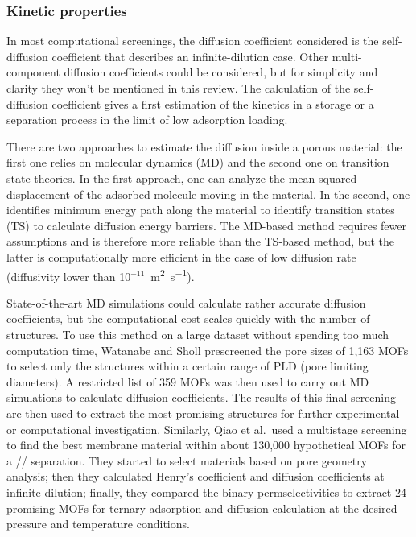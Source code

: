\documentclass[main.tex]{subfiles}
\begin{document}
\subsubsection{Kinetic properties}

In most computational screenings, the diffusion coefficient considered is the self-diffusion coefficient that describes an infinite-dilution case. Other multi-component diffusion coefficients could be considered, but for simplicity and clarity they won't be mentioned in this review. The calculation of the self-diffusion coefficient gives a first estimation of the kinetics in a storage or a separation process in the limit of low adsorption loading.

There are two approaches to estimate the diffusion inside a porous material: the first one relies on molecular dynamics (MD) and the second one on transition state theories. In the first approach, one can analyze the mean squared displacement of the adsorbed molecule moving in the material. In the second, one identifies minimum energy path along the material to identify transition states (TS) to calculate diffusion energy barriers. The MD-based method requires fewer assumptions and is therefore more reliable than the TS-based method, but the latter is computationally more efficient in the case of low diffusion rate (diffusivity lower than 10$^{-11}$~\si{\square\meter\per\second}).

State-of-the-art MD simulations could calculate rather accurate diffusion coefficients, but the computational cost scales quickly with the number of structures. To use this method on a large dataset without spending too much computation time, Watanabe and Sholl prescreened the pore sizes of 1,163 MOFs to select only the structures within a certain range of PLD (pore limiting diameters).\autocite{Watanabe_2012} A restricted list of 359 MOFs was then used to carry out MD simulations to calculate diffusion coefficients. The results of this final screening are then used to extract the most promising structures for further experimental or computational investigation. Similarly, Qiao et al.\ used a multistage screening to find the best membrane material within about 130,000 hypothetical MOFs for a // separation.\autocite{Qiao_2016} They started to select materials based on pore geometry analysis; then they calculated Henry's coefficient and diffusion coefficients at infinite dilution; finally, they compared the binary permselectivities to extract 24 promising MOFs for ternary adsorption and diffusion calculation at the desired pressure and temperature conditions.
\end{document}
